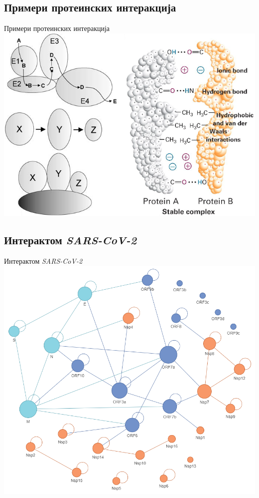 \documentclass[hyperref={bookmarks=false}]{beamer}
\begin{document}
\subsection{Примери протеинских интеракција}
\begin{frame}{Примери протеинских интеракција}
\centering\includegraphics[width=.8\textwidth]{interakcije.png}
\end{frame}

\subsection{Интерактом \textit{SARS-CoV-2}}
\begin{frame}{Интерактом \textit{SARS-CoV-2}}
\centering\includegraphics[width=.65\textwidth]{SARS_iRef.png}
\end{frame}
\end{document}
